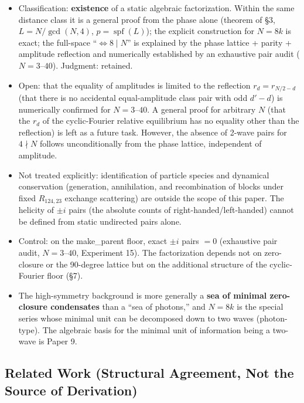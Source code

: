 \documentclass[
  a4paper,
]{ltjsarticle}
\providecommand{\tightlist}{%
  \setlength{\itemsep}{0pt}\setlength{\parskip}{0pt}}
\begin{document}
\begin{itemize}
\tightlist
\item
  Classification: \textbf{existence} of a static algebraic
  factorization. Within the same distance class it is a general proof
  from the phase alone (theorem of §3, \(L=N/\gcd(N,4)\),
  \(p=\operatorname{spf}(L)\)); the explicit construction for \(N=8k\)
  is exact; the full-space ``\(\iff 8\mid N\)'' is explained by the
  phase lattice + parity + amplitude reflection and numerically
  established by an exhaustive pair audit (\(N=3\)--\(40\)). Judgment:
  retained.
\item
  Open: that the equality of amplitudes is limited to the reflection
  \(r_d=r_{N/2-d}\) (that there is no accidental equal-amplitude class
  pair with odd \(d'-d\)) is numerically confirmed for \(N=3\)--\(40\).
  A general proof for arbitrary \(N\) (that the \(r_d\) of the
  cyclic-Fourier relative equilibrium has no equality other than the
  reflection) is left as a future task. However, the absence of 2-wave
  pairs for \(4\nmid N\) follows unconditionally from the phase lattice,
  independent of amplitude.
\item
  Not treated explicitly: identification of particle species and
  dynamical conservation (generation, annihilation, and recombination of
  blocks under fixed \(R_{124,23}\) exchange scattering) are outside the
  scope of this paper. The helicity of \(\pm i\) pairs (the absolute
  counts of right-handed/left-handed) cannot be defined from static
  undirected pairs alone.
\item
  Control: on the make\_parent floor, exact \(\pm i\) pairs \(=0\)
  (exhaustive pair audit, \(N=3\)--\(40\), Experiment 15). The
  factorization depends not on zero-closure or the 90-degree lattice but
  on the additional structure of the cyclic-Fourier floor (§7).
\item
  The high-symmetry background is more generally a \textbf{sea of
  minimal zero-closure condensates} than a ``sea of photons,'' and
  \(N=8k\) is the special series whose minimal unit can be decomposed
  down to two waves (photon-type). The algebraic basis for the minimal
  unit of information being a two-wave is Paper 9.
\end{itemize}

\subsection{Related Work (Structural Agreement, Not the Source of
Derivation)}\label{related-work-structural-agreement-not-the-source-of-derivation}
\end{document}
